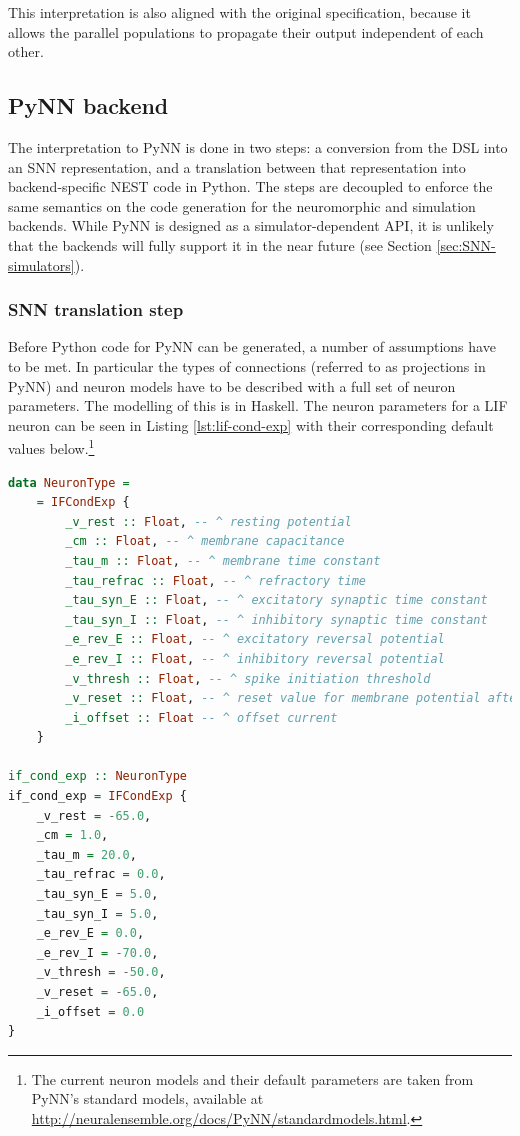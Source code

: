 This interpretation is also aligned with the original specification, 
because it allows the parallel populations to propagate their output
independent of each other.

\subsection{PyNN backend}
The interpretation to PyNN is done in two steps: a
conversion from the \gls{DSL} into an \gls{SNN} representation,
and a translation between that representation into backend-specific
NEST code in Python. 
The steps are decoupled to enforce the same semantics on the code
generation for the neuromorphic and simulation backends.
While PyNN is designed as a simulator-dependent \gls{API}, 
it is unlikely that the backends will fully support it in the
near future (see Section \ref{sec:SNN-simulators}).

\subsubsection{\gls{SNN} translation step}
Before Python code for PyNN can be generated, a number of assumptions
have to be met. 
In particular the types of connections (referred to as projections in PyNN)
and neuron models have to be described with a full set of neuron parameters.
The modelling of this is in Haskell.
The neuron parameters for a LIF neuron can be seen in Listing
\ref{lst:lif-cond-exp} with their corresponding default values
below.\footnote{
The current neuron models and their default parameters are taken from PyNN's
standard models, available at
\url{http://neuralensemble.org/docs/PyNN/standardmodels.html}.
}

\begin{lstlisting}[language=Haskell,caption={A LIF neuron with exponential decay and
  conductance-based synapses, modelled in Haskell.},label={lst:lif-cond-exp}]
data NeuronType =
    = IFCondExp {
        _v_rest :: Float, -- ^ resting potential
        _cm :: Float, -- ^ membrane capacitance
        _tau_m :: Float, -- ^ membrane time constant
        _tau_refrac :: Float, -- ^ refractory time
        _tau_syn_E :: Float, -- ^ excitatory synaptic time constant
        _tau_syn_I :: Float, -- ^ inhibitory synaptic time constant
        _e_rev_E :: Float, -- ^ excitatory reversal potential
        _e_rev_I :: Float, -- ^ inhibitory reversal potential
        _v_thresh :: Float, -- ^ spike initiation threshold
        _v_reset :: Float, -- ^ reset value for membrane potential after a spike
        _i_offset :: Float -- ^ offset current
    }

if_cond_exp :: NeuronType
if_cond_exp = IFCondExp {
    _v_rest = -65.0,
    _cm = 1.0,
    _tau_m = 20.0,
    _tau_refrac = 0.0,
    _tau_syn_E = 5.0,
    _tau_syn_I = 5.0,
    _e_rev_E = 0.0,
    _e_rev_I = -70.0,
    _v_thresh = -50.0,
    _v_reset = -65.0,
    _i_offset = 0.0
}
\end{lstlisting}

